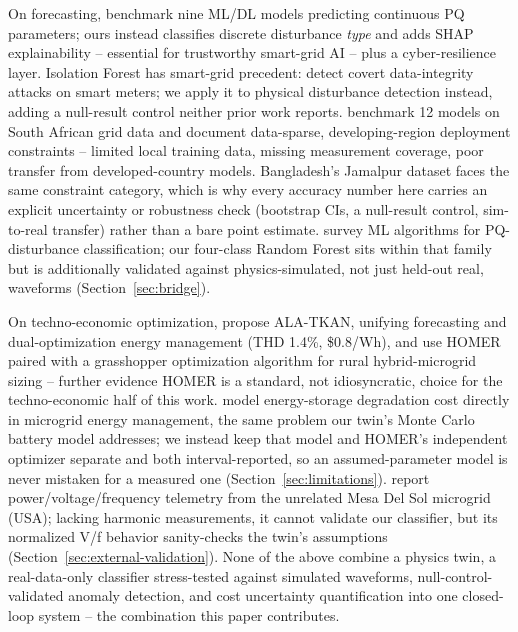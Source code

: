 \documentclass[conference,a4paper]{IEEEtran}
\begin{document}
On forecasting, \cite{jahan2026mlpq} benchmark nine ML/DL models
predicting continuous PQ parameters; ours instead classifies discrete
disturbance \emph{type} and adds SHAP explainability -- essential for
trustworthy smart-grid AI \cite{kandula2026xaireview} -- plus a
cyber-resilience layer. Isolation Forest has smart-grid precedent:
\cite{ahmed2019isolationforest} detect covert data-integrity attacks
on smart meters; we apply it to physical disturbance detection
instead, adding a null-result control neither prior work reports.
\cite{osifeko2025aiforecasting} benchmark 12 models on South African
grid data and document data-sparse, developing-region deployment
constraints -- limited local training data, missing measurement
coverage, poor transfer from developed-country models. Bangladesh's
Jamalpur dataset faces the same constraint category, which is why
every accuracy number here carries an explicit uncertainty or
robustness check (bootstrap CIs, a null-result control, sim-to-real
transfer) rather than a bare point estimate.
\cite{akkaya2024pqclassifier} survey ML algorithms for PQ-disturbance
classification; our four-class Random Forest sits within that family
but is additionally validated against physics-simulated, not just
held-out real, waveforms (Section~\ref{sec:bridge}).

On techno-economic optimization, \cite{daniel2025dualopt} propose
ALA-TKAN, unifying forecasting and dual-optimization energy management
(THD 1.4\%, \$0.8/Wh), and \cite{araoye2024homergoa} use HOMER paired
with a grasshopper optimization algorithm for rural hybrid-microgrid
sizing -- further evidence HOMER is a standard, not idiosyncratic,
choice for the techno-economic half of this work.
\cite{zhao2025batterydegradation} model energy-storage degradation
cost directly in microgrid energy management, the same problem our
twin's Monte Carlo battery model addresses; we instead keep that
model and HOMER's independent optimizer separate and both
interval-reported, so an assumed-parameter model is never mistaken
for a measured one (Section~\ref{sec:limitations}).
\cite{bashir2023mesadelsol} report power/voltage/frequency telemetry
from the unrelated Mesa Del Sol microgrid (USA); lacking harmonic
measurements, it cannot validate our classifier, but its normalized
V/f behavior sanity-checks the twin's assumptions
(Section~\ref{sec:external-validation}). None of the above combine a
physics twin, a real-data-only classifier stress-tested against
simulated waveforms, null-control-validated anomaly detection, and
cost uncertainty quantification into one closed-loop system -- the
combination this paper contributes.
\end{document}
